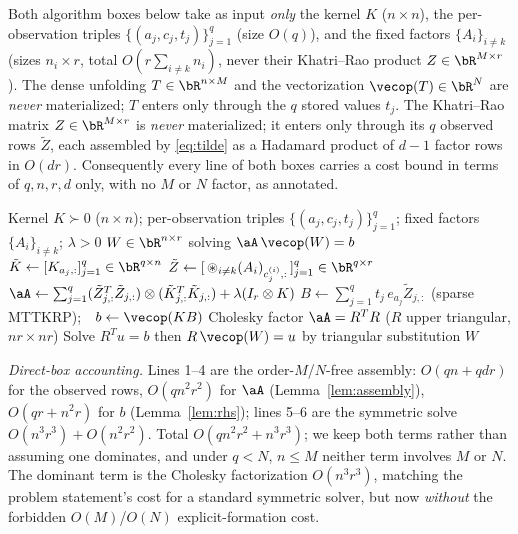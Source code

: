\begin{remark}\label{rem:boxfree}
Both algorithm boxes below take as input \emph{only} the kernel $K$
($n\times n$), the per-observation triples $\{(a_j,c_j,t_j)\}_{j=1}^{q}$ (size
$O(q)$), and the fixed factors $\{A_i\}_{i\neq k}$ (sizes $n_i\times r$, total
$O(r\sum_{i\neq k}n_i)$, never their Khatri--Rao product $Z\in\bR^{M\times r}$).
The dense unfolding $T\in\bR^{n\times M}$ and the vectorization
$\vecop(T)\in\bR^{N}$ are \emph{never} materialized; $T$ enters only through the
$q$ stored values $t_j$. The Khatri--Rao matrix $Z\in\bR^{M\times r}$ is
\emph{never} materialized; it enters only through its $q$ observed rows
$\tilde Z$, each assembled by \eqref{eq:tilde} as a Hadamard product of $d-1$
factor rows in $O(dr)$. Consequently every line of both boxes carries a cost
bound in terms of $q,n,r,d$ only, with no $M$ or $N$ factor, as annotated.
\end{remark}

\begin{algorithm}[h]
\caption{Direct symmetric (Cholesky) solve of the mode-$k$ subproblem}
\label{alg:direct}
\begin{algorithmic}[1]
\Require Kernel $K\succ0$ ($n\times n$); per-observation triples
  $\{(a_j,c_j,t_j)\}_{j=1}^q$; fixed factors $\{A_i\}_{i\neq k}$; $\lambda>0$
\Ensure $W\in\bR^{n\times r}$ solving $\aA\,\vecop(W)=b$
\State $\tilde K\gets[K_{a_j,:}]_{j=1}^q\in\bR^{q\times n}$ 
\State $\tilde Z\gets[\,\circledast_{i\neq k}(A_i)_{c_j^{(i)},:}\,]_{j=1}^q\in\bR^{q\times r}$
\State $\aA\gets\sum_{j=1}^q(\tilde Z_{j,:}^{T}\tilde Z_{j,:})\otimes(\tilde K_{j,:}^{T}\tilde K_{j,:})+\lambda(I_r\otimes K)$
\State $B\gets\sum_{j=1}^q t_j\,e_{a_j}\tilde Z_{j,:}$ (sparse MTTKRP);\ \ $b\gets\vecop(KB)$
\State Cholesky factor $\aA=R^{T}R$ ($R$ upper triangular, $nr\times nr$)
\State Solve $R^{T}u=b$ then $R\,\vecop(W)=u$ by triangular substitution
\State \Return $W$
\end{algorithmic}
\end{algorithm}

\noindent
\emph{Direct-box accounting.} Lines 1--4 are the order-$M$/$N$-free assembly:
$O(qn+qdr)$ for the observed rows, $O(qn^2r^2)$ for $\aA$
(Lemma~\ref{lem:assembly}), $O(qr+n^2r)$ for $b$ (Lemma~\ref{lem:rhs}); lines
5--6 are the symmetric solve $O(n^3r^3)+O(n^2r^2)$. Total
$O(qn^2r^2+n^3r^3)$; we keep both terms rather than assuming one dominates, and
under $q<N$, $n\le M$ neither term involves $M$ or $N$. The dominant
term is the Cholesky factorization $O(n^3r^3)$, matching the problem statement's
cost for a standard symmetric solver, but now \emph{without} the forbidden
$O(M)$/$O(N)$ explicit-formation cost.

